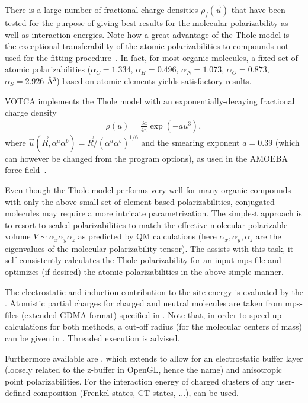There is a large number of fractional charge densities $\rho_f(\vec{u})$ that 
have been tested for the purpose of giving best results for the molecular 
polarizability as well as interaction energies. Note how a great advantage of 
the Thole model is the exceptional transferability of the atomic 
polarizabilities to compounds not used for the fitting 
procedure~\cite{van_duijnen_molecular_1998}. In fact, for most organic 
molecules, a fixed set of atomic polarizabilities ($\alpha_C = 1.334$, $\alpha_H 
= 0.496$, $\alpha_N = 1.073$, $\alpha_O = 0.873$, $\alpha_S = 2.926$ \AA$^3$) 
based on atomic elements yields satisfactory results.

VOTCA implements the Thole model with an exponentially-decaying fractional 
charge density
\begin{align}
 \rho(u) = \frac{3a}{4\pi} \exp(-au^3),
\end{align}
where $\vec{u}(\vec{R},\alpha^a \alpha^b) = \vec{R} / (\alpha^a \alpha^b)^{1/6}$ 
and the smearing exponent $a=0.39$ (which can however be changed from the 
program options), as used in the AMOEBA force field~\cite{ren_polarizable_2003}.

Even though the Thole model performs very well for many organic compounds with 
only the above small set of element-based polarizabilities, conjugated molecules 
may require a more intricate parametrization. The simplest approach is to resort 
to scaled polarizabilities to match the effective molecular polarizable volume 
$V \sim \alpha_{x} \alpha_{y} \alpha_{z}$ as predicted by QM calculations (here 
$\alpha_x, \alpha_y, \alpha_z$ are the eigenvalues of the molecular 
polarizability tensor). The  \tool assists with this task, it 
self-consistently calculates the Thole polarizability for an input mps-file and 
optimizes (if desired) the atomic polarizabilities in the above simple manner.


The electrostatic and induction contribution to the site energy is evaluated by 
the  \calculator. Atomistic partial charges for charged and 
neutral molecules are taken from mps-files (extended GDMA format) specified in 
\xmlmap. Note that, in order to speed up calculations for both methods, a 
cut-off radius (for the molecular centers of mass) can be given in \xmloptions. 
Threaded execution is advised.


Furthermore available are , which extends  to 
allow for an electrostatic buffer layer (loosely related to the z-buffer in 
OpenGL, hence the name) and anisotropic point polarizabilities. For the 
interaction energy of charged clusters of any user-defined composition (Frenkel 
states, CT states, ...),  can be used.

